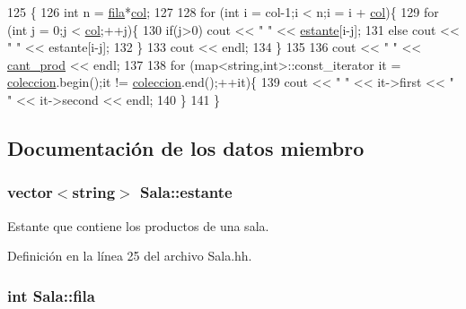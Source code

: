 \begin{DoxyCode}
125                           \{
126     \textcolor{keywordtype}{int} n = \hyperlink{class_sala_a090b8f87fae0a129fb45ef59163a2820}{fila}*\hyperlink{class_sala_a72a33e3787879e17844a904e19c6a4b4}{col};
127 
128     \textcolor{keywordflow}{for} (\textcolor{keywordtype}{int} i = col-1;i < n;i = i + \hyperlink{class_sala_a72a33e3787879e17844a904e19c6a4b4}{col})\{
129         \textcolor{keywordflow}{for} (\textcolor{keywordtype}{int} j = 0;j < \hyperlink{class_sala_a72a33e3787879e17844a904e19c6a4b4}{col};++j)\{
130             \textcolor{keywordflow}{if}(j>0) cout << \textcolor{stringliteral}{" "} << \hyperlink{class_sala_ad5a8ee89a13199441da41fee39a80444}{estante}[i-j];
131             \textcolor{keywordflow}{else} cout << \textcolor{stringliteral}{"  "} << estante[i-j];
132         \}
133         cout << endl;
134     \}
135 
136     cout << \textcolor{stringliteral}{"  "} << \hyperlink{class_sala_aeb69af6cc00cfc97cfa4d18e1bd5e232}{cant\_prod} << endl;
137 
138     \textcolor{keywordflow}{for} (map<string,int>::const\_iterator it = \hyperlink{class_sala_a1eea693397545de9c4750859bb58eae8}{coleccion}.begin();it != 
      \hyperlink{class_sala_a1eea693397545de9c4750859bb58eae8}{coleccion}.end();++it)\{
139         cout << \textcolor{stringliteral}{"  "} << it->first << \textcolor{stringliteral}{" "} << it->second << endl;
140     \}
141 \}
\end{DoxyCode}


\subsection{Documentación de los datos miembro}
\subsubsection[{\texorpdfstring{estante}{estante}}]{\setlength{\rightskip}{0pt plus 5cm}vector$<$string$>$ Sala\+::estante\hspace{0.3cm}{\ttfamily [private]}}\hypertarget{class_sala_ad5a8ee89a13199441da41fee39a80444}{}\label{class_sala_ad5a8ee89a13199441da41fee39a80444}


Estante que contiene los productos de una sala. 



Definición en la línea 25 del archivo Sala.\+hh.

\subsubsection[{\texorpdfstring{fila}{fila}}]{\setlength{\rightskip}{0pt plus 5cm}int Sala\+::fila\hspace{0.3cm}{\ttfamily [private]}}\hypertarget{class_sala_a090b8f87fae0a129fb45ef59163a2820}{}\label{class_sala_a090b8f87fae0a129fb45ef59163a2820}


